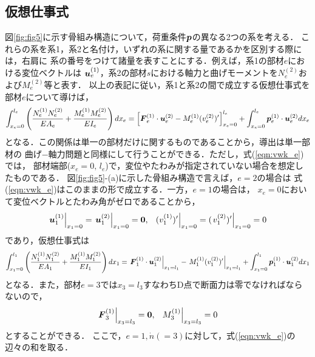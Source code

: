 \documentclass[10pt,a4j]{jarticle}
\begin{document}
\subsection{仮想仕事式}
図\ref{fig:fig5}に示す骨組み構造について，荷重条件$\mbox{\boldmath $p$}$の異なる2つの系を考える．
これらの系を系1，系2と名付け，いずれの系に関する量であるかを区別する際には，右肩に
系の番号をつけて諸量を表すことにする．例えば，系1の部材$e$における変位ベクトルは
$\mbox{\boldmath $u$}^{(1)}_e$，系2の部材$s$における軸力と曲げモーメントを$N^{(2)}_e$および$M^{(2)}_e$等と表す．
以上の表記に従い，系1と系2の間で成立する仮想仕事式を部材$e$について導けば，
\begin{equation}
	\int_{x_e=0}^{l_e} 
	\left(
	\frac{N_e^{(1)}N_e^{(2)}}{EA_e}
	+
	\frac{M_e^{(1)}M_e^{(2)}}{EI_e}
	\right)
	dx_e
	=
	\left[ 
		\mbox{\boldmath $F$}_e^{(1)}\cdot \mbox{\boldmath $u$}_e^{(2)}
		-
		M_e^{(1)}
		(v_e^{(2)})'
	\right]_{x_e=0}^{l_e}
	+
	\int_{x_e=0}^{l_e} 
	\mbox{\boldmath $p$}_e^{(1)}\cdot \mbox{\boldmath $u$}_e^{(2)}
	dx_e
	\label{eqn:vwk_e}
\end{equation}
となる．この関係は単一の部材だけに関するものであることから，導出は単一部材の
曲げ−軸力問題と同様にして行うことができる．ただし，式(\ref{eqn:vwk_e})では，
部材端部($x_e=0,\,l_e$)で，変位やたわみが指定されていない場合を想定したものである．
図\ref{fig:fig5}-(a)に示した骨組み構造で言えば，$e=2$の場合は
式(\ref{eqn:vwk_e})はこのままの形で成立する．一方，$e=1$の場合は，
$x_e=0$において変位ベクトルとたわみ角がゼロであることから，
\begin{equation}
	\left. \fat{u}^{(1)}_1\right|_{x_1=0}
	=
	\left. \fat{u}^{(2)}_1\right|_{x_1=0}
	=\fat{0}, \ \ 
	\left. (v^{(1)}_1)'\right|_{x_1=0}
	=(
	\left.
	v^{(2)}_1)'\right|_{x_1=0}
	=0
	\label{eqn:fixed_end}
\end{equation}
であり，仮想仕事式は
\begin{equation}
	\int_{x_1=0}^{l_1} 
	\left(
	\frac{N_1^{(1)}N_1^{(2)}}{EA_1}
	+
	\frac{M_1^{(1)}M_1^{(2)}}{EI_1}
	\right)
	dx_1
	=
	\left. 
		\mbox{\boldmath $F$}_1^{(1)}\cdot \mbox{\boldmath $u$}_1^{(2)}
	\right|_{x_1=l_1}
		-
	\left. 
		M_1^{(1)}
		(v_1^{(2)})'
	\right|_{x_1=l_1}
	+
	\int_{x_1=0}^{l_1} 
	\mbox{\boldmath $p$}_1^{(1)}\cdot \mbox{\boldmath $u$}_1^{(2)}
	dx_1
	\label{eqn:}
\end{equation}
となる．また，部材$e=3$では$x_3=l_3$すなわちD点で断面力は零でなければならないので，
\begin{equation}
	\left. \fat{F}^{(1)}_3 \right|_{x_3=l_3}=\fat{0}, \ \ 
	\left. M_3^{(1)} \right|_{x_3=l_3}=0
	\label{eqn:free_end}
\end{equation}
とすることができる．
ここで，$e=1,\dot n(=3)$に対して，式(\ref{eqn:vwk_e})の辺々の和を取る．
\end{document}
